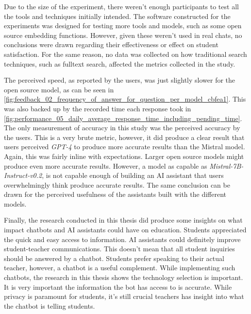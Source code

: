 

Due to the size of the experiment, there weren't enough participants to test all the tools and techniques initially intended. The software constructed for the experiments was designed for testing more tools and models, such as some open source embedding functions. However, given these weren’t used in real chats, no conclusions were drawn regarding their effectiveness or effect on student satisfaction. For the same reason, no data was collected on how traditional search techniques, such as fulltext search, affected the metrics collected in the study.




The perceived speed, as reported by the users, was just slightly slower for the open source model, as can be seen in \autoref{fig:feedback_02_frequency_of_answer_for_question_per_model_cbfea1}. This was also backed up by the recorded time each response took in \autoref{fig:performance_05_daily_average_response_time_including_pending_time}. The only measurement of accuracy in this study was the perceived accuracy by the users. This is a very brute metric, however, it did produce a clear result that users perceived \textit{GPT-4} to produce more accurate results than the Mistral model. Again, this was fairly inline with expectations. Larger open source models might produce even more accurate results. However, a model as capable as \textit{Mistral-7B-Instruct-v0.2}, is not capable enough of building an AI assistant that users overwhelmingly think produce accurate results. The same conclusion can be drawn for the perceived usefulness of the assistants built with the different models.




Finally, the research conducted in this thesis did produce some insights on what impact chatbots and AI assistants could have on education. Students appreciated the quick and easy access to information. AI assistants could definitely improve student-teacher communications. This doesn’t mean that all student inquiries should be answered by a chatbot. Students prefer speaking to their actual teacher, however, a chatbot is a useful complement. While implementing such chatbots, the research in this thesis shows the technology selection is important. It is very important the information the bot has access to is accurate. While privacy is paramount for students, it’s still crucial teachers has insight into what the chatbot is telling students.



